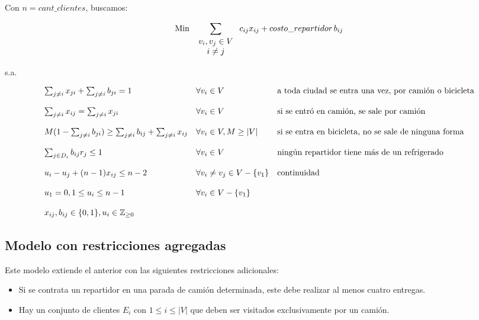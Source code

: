 \documentclass[10pt,a4paper]{article}
\begin{document}
	Con $n = cant\_clientes$, buscamos:

	\[
		\text{Min } \sum_{ \begin{tabular}{c}
				$v_i, v_j \in V$ \\
				$ i \neq j$
		\end{tabular}
		} c_{ij} x_{ij} + costo\_repartidor\,b_{ij}
	\]

	s.a.

	\[
	\begin{array}{l l l}
		\sum_{j \neq i} x_{ji} + \sum_{j \neq i} b_{ji} = 1 & \forall v_i \in V & \text{a toda ciudad se entra una vez, por camión o bicicleta} \\
		\\
		\sum_{j \neq i} x_{ij} = \sum_{j\neq i} x_{ji} & \forall v_i \in V & \text{si se entró en camión, se sale por camión} \\
		\\
		M(1 - \sum_{j \neq i} b_{ji}) \geq \sum_{j \neq i} b_{ij} + \sum_{j \neq i} x_{ij} & \forall v_i \in V, M \geq |V| & \text{si se entra en bicicleta, no se sale de ninguna forma} \\
		\\
		\sum_{j \in D_i} b_{ij} r_j \leq 1 & \forall v_i \in V & \text{ningún repartidor tiene más de un refrigerado} \\
		\\
		u_i - u_j + (n - 1) x_{ij} \leq n - 2 & \forall v_i \neq v_j \in V - \{v_1\} & \text{continuidad} \\
		\\
		u_1 = 0, 1 \leq u_i \leq n-1 & \forall v_i \in V - \{v_1\} \\
		\\
		x_{ij}, b_{ij} \in \{0,1\}, u_i \in \mathbb{Z}_{\geq 0}
	\end{array}
	\]
	
	\subsection{Modelo con restricciones agregadas}
	Este modelo extiende el anterior con las siguientes restricciones adicionales:
	\begin{itemize}
		\item Si se contrata un repartidor en una parada de camión determinada, este debe realizar al menos cuatro entregas.
		\item Hay un conjunto de clientes $E_i$ con $1 \leq i \leq |V|$ que deben ser visitados exclusivamente por un camión.
	\end{itemize}
\end{document}
